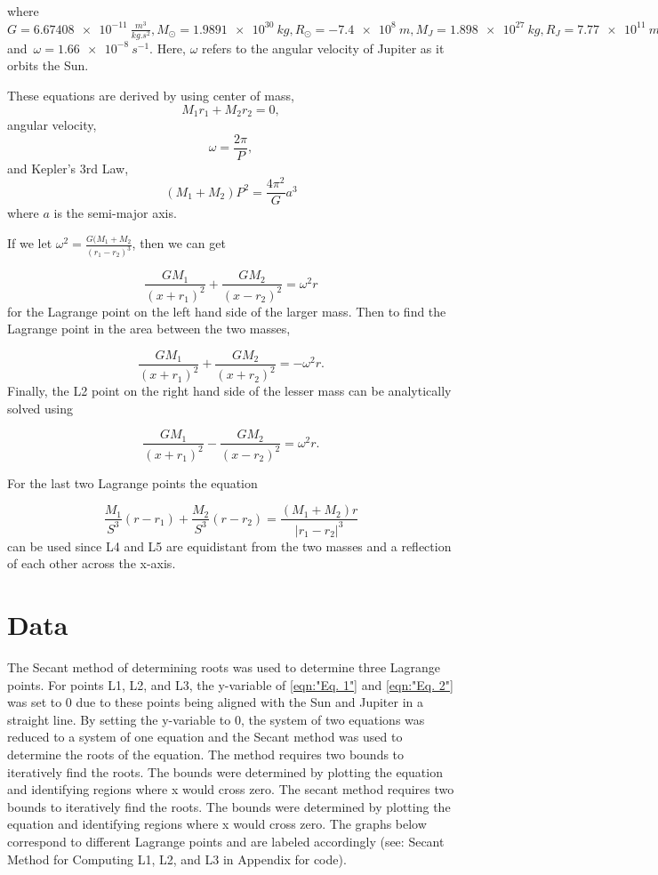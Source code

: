 \documentclass[linenumbers,RNAAS,trackchanges]{aastex631}
\begin{document}
where $G = \SI{6.67408e-11}{\frac{m^3}{kg.s^2}}, M_\odot = \SI{1.9891e30}{kg}, R_\odot = \SI{-7.4e8}{m}, M_{J} = \SI{1.898e27}{kg}, R_{J} = \SI{7.77e11}{m}, $and $\, {\omega} = \SI{1.66e-8}{s^{-1}}.$ Here, ${\omega}$ refers to the angular velocity of Jupiter as it orbits the Sun.

These equations are derived by using center of mass,
$$M_1 r_1 + M_2 r_2 = 0,$$
angular velocity,
$$\omega = \frac{2\pi}{P},$$
and Kepler's 3rd Law,
$$(M_1 +M_2) P^2 = \frac{4\pi^2}{G}a^3$$ where $a$ is the semi-major axis.

If we let $\omega^2 = \frac{G(M_1 + M_2}{(r_1 -r_2)^3}$, then we can get

$$\frac{GM_1}{(x+r_1)^2} + \frac{GM_2}{(x-r_2)^2} = \omega^2r$$ for the Lagrange point on the left hand side of the larger mass. Then to find the Lagrange point in the area between the two masses,

$$\frac{GM_1}{(x+r_1)^2} + \frac{GM_2}{(x+r_2)^2} = -\omega^2r.$$
Finally, the L2 point on the right hand side of the lesser mass can be analytically solved using

$$\frac{GM_1}{(x+r_1)^2} - \frac{GM_2}{(x-r_2)^2} = \omega^2r.$$

For the last two Lagrange points the equation 

$$\frac{M_1}{S^3}(r - r_1) + \frac{M_2}{S^3}(r-r_2) = \frac{(M_1+M_2)r}{|r_1 - r_2|^3}$$ can be used since L4 and L5 are equidistant from the two masses and a reflection of each other across the x-axis. 

\section{Data} \label{sec:data}
The Secant method of determining roots was used to determine three Lagrange points. For points L1, L2, and L3, the y-variable of \ref{eqn:"Eq. 1"} and \ref{eqn:"Eq. 2"} was set to 0 due to these points being aligned with the Sun and Jupiter in a straight line. By setting the y-variable to 0, the system of two equations was reduced to a system of one equation and the Secant method was used to determine the roots of the equation. The method requires two bounds to iteratively find the roots. The bounds were determined by plotting the equation and identifying regions where x would cross zero. The secant method requires two bounds to iteratively find the roots. The bounds were determined by plotting the equation and identifying regions where x would cross zero. The graphs below correspond to different Lagrange points and are labeled accordingly (see: Secant Method for Computing L1, L2, and L3 in Appendix for code).
\end{document}
